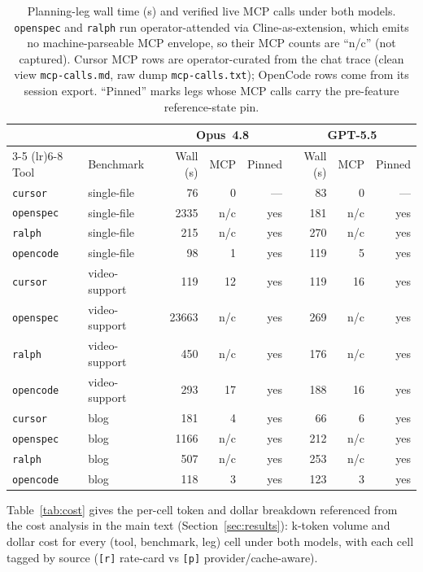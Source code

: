 \begin{table}[h]
\centering
\caption{Planning-leg wall time (s) and verified live MCP calls under
both models. \texttt{openspec} and \texttt{ralph} run operator-attended
via Cline-as-extension, which emits no machine-parseable MCP envelope,
so their MCP counts are ``n/c'' (not captured). Cursor MCP rows are
operator-curated from the chat trace (clean view
\texttt{mcp-calls.md}, raw dump \texttt{mcp-calls.txt}); OpenCode rows
come from its session export. ``Pinned'' marks legs whose MCP calls
carry the pre-feature reference-state pin.}
\label{tab:walltime}
\begin{tabular}{ll rrr rrr}
\toprule
 & & \multicolumn{3}{c}{Opus~4.8} & \multicolumn{3}{c}{GPT-5.5} \\
 \cmidrule(lr){3-5} \cmidrule(lr){6-8}
Tool & Benchmark & Wall (s) & MCP & Pinned & Wall (s) & MCP & Pinned \\
\midrule
\texttt{cursor}     & single-file   &    76 & 0   & ---  &  83 & 0   & ---  \\
\texttt{openspec}   & single-file   &  2335 & n/c & yes  & 181 & n/c & yes  \\
\texttt{ralph}      & single-file   &   215 & n/c & yes  & 270 & n/c & yes  \\
\texttt{opencode} & single-file   &    98 & 1   & yes  & 119 & 5   & yes  \\
\midrule
\texttt{cursor}     & video-support  &   119 & 12  & yes  & 119 & 16  & yes  \\
\texttt{openspec}   & video-support  & 23663 & n/c & yes  & 269 & n/c & yes  \\
\texttt{ralph}      & video-support  &   450 & n/c & yes  & 176 & n/c & yes  \\
\texttt{opencode} & video-support  &   293 & 17  & yes  & 188 & 16  & yes  \\
\midrule
\texttt{cursor}     & blog     &   181 & 4   & yes  &  66 & 6   & yes  \\
\texttt{openspec}   & blog     &  1166 & n/c & yes  & 212 & n/c & yes  \\
\texttt{ralph}      & blog     &   507 & n/c & yes  & 253 & n/c & yes  \\
\texttt{opencode} & blog     &   118 & 3   & yes  & 123 & 3   & yes  \\
\bottomrule
\end{tabular}
\end{table}

Table~\ref{tab:cost} gives the per-cell token and dollar breakdown
referenced from the cost analysis in the main text
(Section~\ref{sec:results}): k-token volume and dollar cost for every (tool,
benchmark, leg) cell under both models, with each cell tagged by
source (\texttt{[r]} rate-card vs \texttt{[p]} provider/cache-aware).

